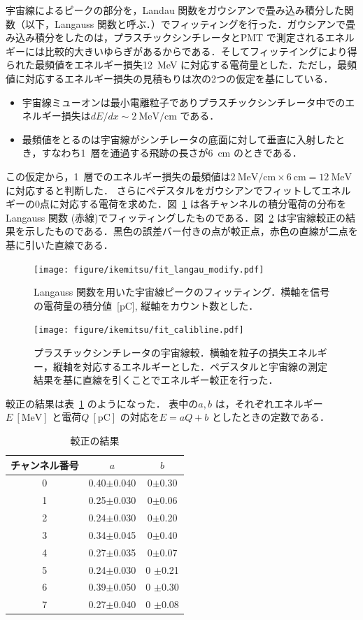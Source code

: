 宇宙線によるピークの部分を，Landau 関数をガウシアンで畳み込み積分した関数（以下，Langauss 関数と呼ぶ．）でフィッティングを行った．ガウシアンで畳み込み積分をしたのは，プラスチックシンチレータとPMT で測定されるエネルギーには比較的大きいゆらぎがあるからである．そしてフィッテイングにより得られた最頻値をエネルギー損失12~MeV に対応する電荷量とした．ただし，最頻値に対応するエネルギー損失の見積もりは次の2つの仮定を基にしている．
\begin{itemize}
\item 宇宙線ミューオンは最小電離粒子でありプラスチックシンチレータ中でのエネルギー損失は$dE/dx \sim 2~\mathrm{MeV/cm}$ である．
\item 最頻値をとるのは宇宙線がシンチレータの底面に対して垂直に入射したとき，すなわち1~層を通過する飛跡の長さが6~cm のときである．
\end{itemize}
この仮定から，1~層でのエネルギー損失の最頻値は$2~\mathrm{MeV/cm} \times 6~\mathrm{cm} = 12~\mathrm{MeV}$ に対応すると判断した\cite{leo}．
さらにペデスタルをガウシアンでフィットしてエネルギーの0点に対応する電荷を求めた．図~\ref{ps_langau} は各チャンネルの積分電荷の分布をLangauss 関数 (赤線)でフィッティングしたものである．図~\ref{ps_cali} は宇宙線較正の結果を示したものである．黒色の誤差バー付きの点が較正点，赤色の直線が二点を基に引いた直線である．

\begin{figure}[H]
\centering
\texttt{[image: figure/ikemitsu/fit\_langau\_modify.pdf]}
\caption{Langauss 関数を用いた宇宙線ピークのフィッティング．横軸を信号の電荷量の積分値~[pC], 縦軸をカウント数とした．}
\label{ps_langau}
\end{figure} 
\begin{figure}[H]
\centering
\texttt{[image: figure/ikemitsu/fit\_calibline.pdf]}
\caption{プラスチックシンチレータの宇宙線較．横軸を粒子の損失エネルギー，縦軸を対応するエネルギーとした．ペデスタルと宇宙線の測定結果を基に直線を引くことでエネルギー較正を行った．}\label{ps_cali}
\end{figure}

較正の結果は表~\ref{PS_calib_table} のようになった．
表中の$a, b$ は，それぞれエネルギー$E~[\mathrm{MeV }]$ と電荷$Q~[\mathrm{pC}]$ の対応を$E = a Q + b$ としたときの定数である．
\begin{table}[h]
\caption{較正の結果}
\label{PS_calib_table}
\centering
\begin{tabular}{ccc}\toprule
チャンネル番号 & $a$ & $b$ \\ \midrule
0 & 0.40$\pm$0.040 & 0$\pm$0.30 \\
1 & 0.25$\pm$0.030 & 0$\pm$0.06 \\
2 & 0.24$\pm$0.030 & 0$\pm$0.20 \\
3 & 0.34$\pm$0.045 & 0$\pm$0.40 \\
4 & 0.27$\pm$0.035 & 0$\pm$0.07 \\
5 & 0.24$\pm$0.030 &0 $\pm$0.21 \\
6 & 0.39$\pm$0.050 &0 $\pm$0.30 \\
7 & 0.27$\pm$0.040 &0 $\pm$0.08 \\ \bottomrule
\end{tabular}
\end{table}%

